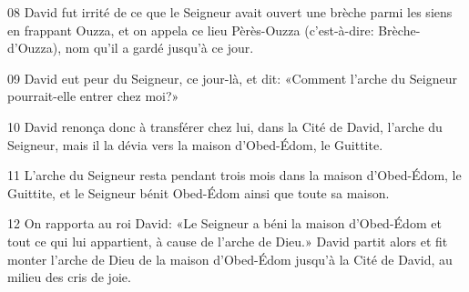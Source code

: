 
08 David fut irrité de ce que le Seigneur avait ouvert une brèche parmi les siens en frappant Ouzza, et on appela ce lieu Pèrès-Ouzza (c’est-à-dire: Brèche-d’Ouzza), nom qu’il a gardé jusqu’à ce jour.

09 David eut peur du Seigneur, ce jour-là, et dit: «Comment l’arche du Seigneur pourrait-elle entrer chez moi?»

10 David renonça donc à transférer chez lui, dans la Cité de David, l’arche du Seigneur, mais il la dévia vers la maison d’Obed-Édom, le Guittite.

11 L’arche du Seigneur resta pendant trois mois dans la maison d’Obed-Édom, le Guittite, et le Seigneur bénit Obed-Édom ainsi que toute sa maison.

12 On rapporta au roi David: «Le Seigneur a béni la maison d’Obed-Édom et tout ce qui lui appartient, à cause de l’arche de Dieu.» David partit alors et fit monter l’arche de Dieu de la maison d’Obed-Édom jusqu’à la Cité de David, au milieu des cris de joie.